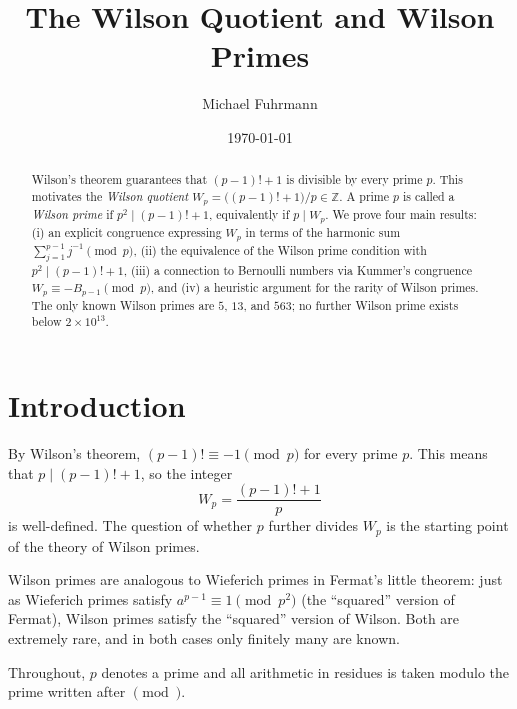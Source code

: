 \documentclass[12pt,a4paper]{amsart}
\theoremstyle{definition}
\newcommand{\Z}{\mathbb{Z}}
\begin{document}

\title{The Wilson Quotient and Wilson Primes}

\author{Michael Fuhrmann}
\address{Specialist Mathematics Project, Build 64}
\date{\today}

\begin{abstract}
Wilson's theorem guarantees that $(p-1)! + 1$ is divisible by every prime $p$.
This motivates the \emph{Wilson quotient} $W_p = \bigl((p-1)!+1\bigr)/p \in \Z$.
A prime $p$ is called a \emph{Wilson prime} if $p^2 \mid (p-1)!+1$, equivalently
if $p \mid W_p$.  We prove four main results:
(i) an explicit congruence expressing $W_p$ in terms of the harmonic sum
$\sum_{j=1}^{p-1} j^{-1} \pmod p$,
(ii) the equivalence of the Wilson prime condition with $p^2 \mid (p-1)!+1$,
(iii) a connection to Bernoulli numbers via Kummer's congruence
$W_p \equiv -B_{p-1} \pmod p$,
and (iv) a heuristic argument for the rarity of Wilson primes.
The only known Wilson primes are $5$, $13$, and $563$; no further Wilson prime
exists below $2 \times 10^{13}$.
\end{abstract}

\maketitle
\tableofcontents

\section{Introduction}

By Wilson's theorem, $(p-1)! \equiv -1 \pmod p$ for every prime $p$.
This means that $p \mid (p-1)! + 1$, so the integer
\[
  W_p = \frac{(p-1)! + 1}{p}
\]
is well-defined.  The question of whether $p$ further divides $W_p$ is the
starting point of the theory of Wilson primes.

Wilson primes are analogous to Wieferich primes in Fermat's little theorem:
just as Wieferich primes satisfy $a^{p-1} \equiv 1 \pmod{p^2}$ (the
``squared'' version of Fermat), Wilson primes satisfy the ``squared'' version
of Wilson.  Both are extremely rare, and in both cases only finitely many are known.

Throughout, $p$ denotes a prime and all arithmetic in residues is taken
modulo the prime written after $\pmod{}$.
\end{document}
